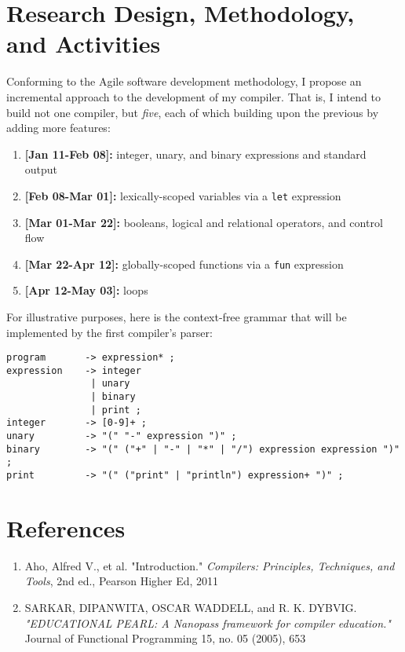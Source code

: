 \documentclass[12pt]{report}
\begin{document}
\section*{{\large Research Design, Methodology, and Activities}}
Conforming to the Agile software development methodology, I propose an incremental approach to the development of my compiler.  That is, I intend to build not one compiler, but \textit{five}, each of which building upon the previous by adding more features:

\begin{enumerate}
	\item \textbf{[Jan 11-Feb 08]:} integer, unary, and binary expressions and standard output
	\item \textbf{[Feb 08-Mar 01]:} lexically-scoped variables via a \lstinline{let} expression
	\item \textbf{[Mar 01-Mar 22]:} booleans, logical and relational operators, and control flow
	\item \textbf{[Mar 22-Apr 12]:} globally-scoped functions via a \lstinline{fun} expression
	\item \textbf{[Apr 12-May 03]:} loops
\end{enumerate}
For illustrative purposes, here is the context-free grammar that will be implemented by the first compiler's parser:
\begin{lstlisting}
program       -> expression* ;
expression    -> integer
               | unary
               | binary
               | print ;
integer       -> [0-9]+ ;
unary         -> "(" "-" expression ")" ;
binary        -> "(" ("+" | "-" | "*" | "/") expression expression ")" ;
print         -> "(" ("print" | "println") expression+ ")" ;
\end{lstlisting}

\clearpage

\section*{{\large References}}
\begin{enumerate}
	\item[\text{[1]}] Aho, Alfred V., et al. "Introduction." \textit{Compilers: Principles, Techniques, and Tools}, 2nd ed., Pearson Higher Ed, 2011
	\item[\text{[2]}] SARKAR, DIPANWITA, OSCAR WADDELL, and R. K. DYBVIG. \textit{"EDUCATIONAL PEARL: A Nanopass framework for compiler education."} Journal of Functional Programming 15, no. 05 (2005), 653
\end{enumerate}
\end{document}
